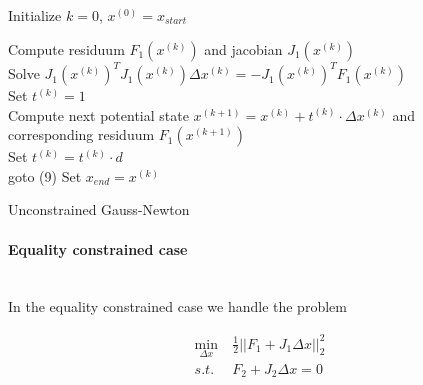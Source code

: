 \documentclass{scrartcl}[12pt, halfparskip]
\numberwithin{equation}{section}
\numberwithin{figure}{section}
\numberwithin{table}{section}
\begin{document}
\begin{algorithm}[H]
	
	
	
	Initialize $k=0$, $x^{(0)} = x_{start}$
	
	{
		Compute residuum $F_1(x^{(k)})$ and jacobian $J_1(x^{(k)})$ \\
		Solve $J_1(x^{(k)})^T J_1(x^{(k)}) \Delta x^{(k)} = - J_1(x^{(k)})^T F_1(x^{(k)})$ \\
		Set $t^{(k)} = 1$ \\
		Compute next potential state $x^{(k+1)} = x^{(k)} + t^{(k)} \cdot \Delta x^{(k)}$ and \\ \quad corresponding residuum $F_1(x^{(k+1)})$ \\
		
		{Set $t^{(k)} = t^{(k)} \cdot d$ \\
			goto (9)}
	}
	Set $x_{end} = x^{(k)}$
	\caption{Unconstrained Gauss-Newton}
	\label{alg:Gauss_Newton_unconstrained}
\end{algorithm}

\vspace{0.5cm}
\paragraph{Equality constrained case}\mbox{}\\
In the equality constrained case we handle the problem

\begin{align}
	\min_{\Delta x} & \ \frac{1}{2} || F_1 + J_1 \Delta x ||_2^2 \label{eq:numerical_soln_eq_constrained_LSQ} \\
	s.t. & \ F_2 + J_2 \Delta x = 0 \nonumber
\end{align}
\end{document}
